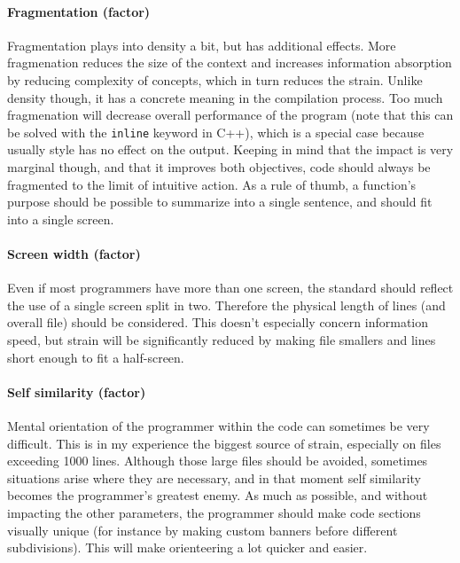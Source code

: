 \documentclass{article}
\begin{document}
\paragraph{Fragmentation (factor)} Fragmentation plays into density a bit, but has additional effects. More fragmenation reduces the size of the context and increases information absorption by reducing complexity of concepts, which in turn reduces the strain. Unlike density though, it has a concrete meaning in the compilation process. Too much fragmenation will decrease overall performance of the program (note that this can be solved with the \texttt{inline} keyword in C++), which is a special case because usually style has no effect on the output. Keeping in mind that the impact is very marginal though, and that it improves both objectives, code should always be fragmented to the limit of intuitive action. As a rule of thumb, a function's purpose should be possible to summarize into a single sentence, and should fit into a single screen. 

\paragraph{Screen width (factor)} Even if most programmers have more than one screen, the standard should reflect the use of a single screen split in two. Therefore the physical length of lines (and overall file) should be considered. This doesn't especially concern information speed, but strain will be significantly reduced by making file smallers and lines short enough to fit a half-screen.

\paragraph{Self similarity (factor)} Mental orientation of the programmer within the code can sometimes be very difficult. This is in my experience the biggest source of strain, especially on files exceeding 1000 lines. Although those large files should be avoided, sometimes situations arise where they are necessary, and in that moment self similarity becomes the programmer's greatest enemy. As much as possible, and without impacting the other parameters, the programmer should make code sections visually unique (for instance by making custom banners before different subdivisions). This will make orienteering a lot quicker and easier.
\end{document}
